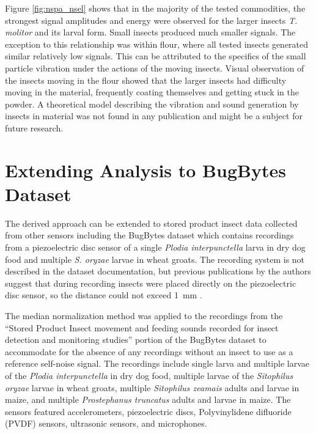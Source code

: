 \documentclass[../Vibro-Acoustic Signatures and Detection Algorithms for Stored Product Insects.tex]{subfiles}
\begin{document}
Figure \ref{fig:nspa_nsel} shows that in the majority of the tested commodities, the strongest signal amplitudes and energy were observed for the larger insects \textit{T. molitor} and its larval form. Small insects produced much smaller signals. The exception to this relationship was within flour, where all tested insects generated similar relatively low signals. This can be attributed to the specifics of the small particle vibration under the actions of the moving insects. Visual observation of the insects moving in the flour showed that the larger insects had difficulty moving in the material, frequently coating themselves and getting stuck in the powder. A theoretical model describing the vibration and sound generation by insects in material was not found in any publication and might be a subject for future research.

\newpage
\section{Extending Analysis to BugBytes Dataset}

The derived approach can be extended to stored product insect data collected from other sensors including the BugBytes dataset which contains recordings from a piezoelectric disc sensor of a single \textit{Plodia interpunctella} larva in dry dog food and multiple \textit{S. oryzae} larvae in wheat groats. The recording system is not described in the dataset documentation, but previous publications by the authors suggest that during recording insects were placed directly on the piezoelectric disc sensor, so the distance could not exceed \SI{1}{\milli\meter} \cite{mankinAcousticIndicatorsTargeted2010}.

The median normalization method was applied to the recordings from the ``Stored Product Insect movement and feeding sounds recorded for insect detection and monitoring studies'' portion of the BugBytes dataset to accommodate for the absence of any recordings without an insect to use as a reference self-noise signal. The recordings include single larva and multiple larvae of the \textit{Plodia interpunctella} in dry dog food, multiple larvae of the \textit{Sitophilus oryzae} larvae in wheat groats, multiple \textit{Sitophilus zeamais} adults and larvae in maize, and multiple \textit{Prostephanus truncatus} adults and larvae in maize. The sensors featured accelerometers, piezoelectric discs, Polyvinylidene difluoride (PVDF) sensors, ultrasonic sensors, and microphones.
\end{document}
